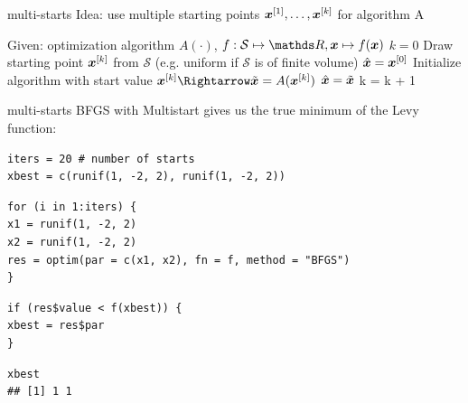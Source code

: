 \documentclass[11pt,compress,t,notes=noshow, xcolor=table]{beamer}
\begin{document}
\begin{framev}{multi-starts}
Idea: use multiple starting points $\bm{x}^{[1]}, \ldots, \bm{x}^{[k]}$ for algorithm A
\begin{algorithm}[H]
\begin{footnotesize}
\begin{center}
\caption{Multistart optimization}
\begin{algorithmic}[1]
\State Given: optimization algorithm $A(\cdot)$, $f: \mathcal{S} \mapsto \R, \xv \mapsto f(\xv)$
\State $k = 0$
\Repeat
\State Draw starting point  $\bm{x}^{[k]}$ from $\mathcal{S}$ (e.g. uniform if $\mathcal{S}$ is of finite volume)
  $\hat{\bm{x}}= \bm{x}^{[0]}$
\EndIf
\State Initialize algorithm with start value $\xv^{[k]} \Rightarrow \tilde{\xv} = A(\xv^{[k]})$
  $\hat{\bm{x}} = \tilde{\bm{x}}$
\EndIf
\State k = k + 1
\\
\Return{$\hat{\xv}$}
\end{algorithmic}
\end{center}
\end{footnotesize}
\end{algorithm}
\end{framev}


\begin{frame}[fragile]{multi-starts}
BFGS with Multistart gives us the true minimum of the Levy function:\\
\spacer
\begin{verbatim}
iters = 20 # number of starts
xbest = c(runif(1, -2, 2), runif(1, -2, 2))
\end{verbatim}
\vspace{0.4cm}
\begin{verbatim}
for (i in 1:iters) {
x1 = runif(1, -2, 2)
x2 = runif(1, -2, 2)
res = optim(par = c(x1, x2), fn = f, method = "BFGS")
}
\end{verbatim}
\spacer
\begin{verbatim}
if (res$value < f(xbest)) {
xbest = res$par
}
\end{verbatim}
\spacer
\begin{verbatim}
xbest
## [1] 1 1
\end{verbatim}
\end{frame}

\endlecture
\end{document}
